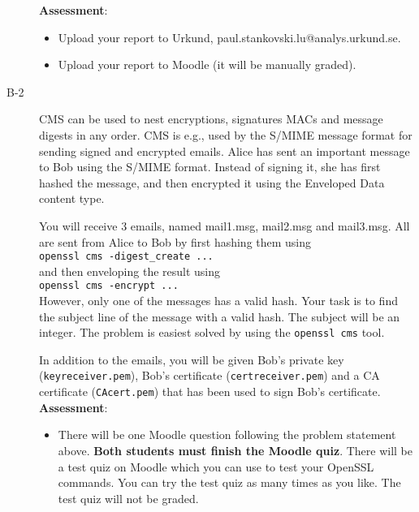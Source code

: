 \documentclass{article}
\begin{document}
\begin{description}
{			\textbf{Assessment}:
			\begin{itemize}
				\item Upload your report to Urkund, paul.stankovski.lu@analys.urkund.se.
				\item Upload your report to Moodle (it will be manually graded).
			\end{itemize}
		}
		
		\item[B-2]{CMS can be used to nest encryptions, signatures MACs and message digests in any order. CMS is e.g., used by the S/MIME message format for sending signed and encrypted emails. Alice has sent an important message to Bob using the S/MIME format. Instead of signing it, she has first hashed the message, and then encrypted it using the Enveloped Data content type.
			
			You will receive 3 emails, named mail1.msg, mail2.msg and mail3.msg. All are sent from Alice to Bob by first hashing them using \\ \texttt{openssl cms -digest\_create ...}\\ and then enveloping the result using \\\texttt{openssl cms -encrypt ...}\\However, only one of the messages has a valid hash. Your task is to find the subject line of the message with a valid hash. The subject will be an integer. The problem is easiest solved by using the \texttt{openssl cms} tool.
			
			In addition to the emails, you will be given Bob's private key (\texttt{keyreceiver.pem}), Bob's certificate (\texttt{certreceiver.pem}) and a CA certificate (\texttt{CAcert.pem}) that has been used to sign Bob's certificate.\\
			\textbf{Assessment}:
			\begin{itemize}
				\item There will be one Moodle question following the problem statement above. \textbf{Both students must finish the Moodle quiz}.
				There will be a test quiz on Moodle which you can use to test your OpenSSL commands. You can try the test quiz as many times as you like. The test quiz will not be graded.
			\end{itemize}}
			

\end{description}
\end{document}
